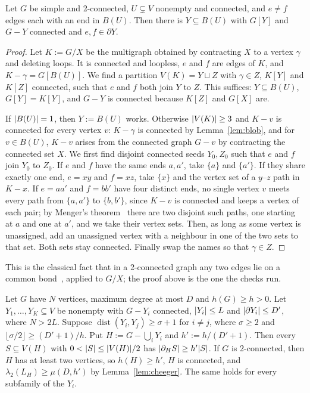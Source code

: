 \begin{lemma}\label{lem:bond}
Let $G$ be simple and 2-connected, $U\subsetneq V$ nonempty and connected, and $e\ne f$ edges each with an end in $B(U)$. Then there is $Y\subseteq B(U)$ with $G[Y]$ and $G-Y$ connected and $e,f\in\partial Y$.
\end{lemma}

\begin{proof}
Let $K:=G/X$ be the multigraph obtained by contracting $X$ to a vertex $\gamma$ and deleting loops. It is connected and loopless, $e$ and $f$ are edges of $K$, and $K-\gamma=G[B(U)]$. We find a partition $V(K)=Y\sqcup Z$ with $\gamma\in Z$, $K[Y]$ and $K[Z]$ connected, such that $e$ and $f$ both join $Y$ to $Z$. This suffices: $Y\subseteq B(U)$, $G[Y]=K[Y]$, and $G-Y$ is connected because $K[Z]$ and $G[X]$ are.

If $\lvert B(U)\rvert=1$, then $Y:=B(U)$ works. Otherwise $\lvert V(K)\rvert\ge3$ and $K-v$ is connected for every vertex $v$: $K-\gamma$ is connected by Lemma~\ref{lem:blob}, and for $v\in B(U)$, $K-v$ arises from the connected graph $G-v$ by contracting the connected set $X$. We first find disjoint connected seeds $Y_0,Z_0$ such that $e$ and $f$ join $Y_0$ to $Z_0$. If $e$ and $f$ have the same ends $a,a'$, take $\{a\}$ and $\{a'\}$. If they share exactly one end, $e=xy$ and $f=xz$, take $\{x\}$ and the vertex set of a $y$--$z$ path in $K-x$. If $e=aa'$ and $f=bb'$ have four distinct ends, no single vertex $v$ meets every path from $\{a,a'\}$ to $\{b,b'\}$, since $K-v$ is connected and keeps a vertex of each pair; by Menger's theorem~\cite[Thm.~3.3.1]{Diestel17} there are two disjoint such paths, one starting at $a$ and one at $a'$, and we take their vertex sets. Then, as long as some vertex is unassigned, add an unassigned vertex with a neighbour in one of the two sets to that set. Both sets stay connected. Finally swap the names so that $\gamma\in Z$.
\end{proof}

This is the classical fact that in a 2-connected graph any two edges lie on a common bond~\cite[Ch.~4]{Oxley11}, applied to $G/X$; the proof above is the one the checks run.

\begin{lemma}\label{lem:sep-delete}
Let $G$ have $N$ vertices, maximum degree at most $D$ and $h(G)\ge h>0$. Let $Y_1,\dots,Y_K\subseteq V$ be nonempty with $G-Y_i$ connected, $\lvert Y_i\rvert\le L$ and $\lvert \partial Y_i\rvert\le D'$, where $N>2L$. Suppose $\operatorname{dist}(Y_i,Y_j)\ge\sigma+1$ for $i\ne j$, where $\sigma\ge2$ and $\lfloor\sigma/2\rfloor\ge(D'+1)/h$. Put $H:=G-\bigcup_iY_i$ and $h':=h/(D'+1)$. Then every $S\subseteq V(H)$ with $0<\lvert S\rvert\le\lvert V(H)\rvert/2$ has $\lvert \partial_HS\rvert\ge h'\lvert S\rvert$. If $G$ is 2-connected, then $H$ has at least two vertices, so $h(H)\ge h'$, $H$ is connected, and $\lambda_2(L_H)\ge\mu(D,h')$ by Lemma~\ref{lem:cheeger}. The same holds for every subfamily of the $Y_i$.
\end{lemma}

